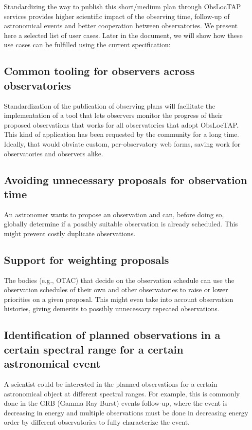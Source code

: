 \documentclass[11pt,a4paper]{ivoa}
\begin{document}
Standardizing the way to publish this short/medium plan through ObsLocTAP
services provides higher scientific impact of the observing time, follow-up of
astronomical events and better cooperation between observatories. We present
here a selected list of user cases. Later in the document, we will show how
these use cases can be fulfilled using the current specification:

\subsection{Common tooling for observers across observatories}
Standardization of the publication of observing plans will facilitate the
implementation of a tool that lets observers monitor the progress of their
proposed observations that works for all observatories that adopt ObsLocTAP.
This kind of application has been requested by the community for a long time.
Ideally, that would obviate custom, per-observatory web forms, saving work for
observatories and observers alike.

\subsection{Avoiding unnecessary proposals for observation time}
An astronomer wants to propose an observation and can, before doing so,
globally determine if a possibly suitable observation is already scheduled.
This might prevent costly duplicate observations.

\subsection{Support for weighting proposals}
The bodies (e.g., OTAC) that decide on the observation schedule can use the
observation schedules of their own and other observatories to raise or lower
priorities on a given proposal. This might even take into account observation
histories, giving demerits to possibly unnecessary repeated observations.

\subsection{Identification of planned observations in a certain spectral range
for a certain astronomical event}
A scientist could be interested in the planned observations for a certain
astronomical object at different spectral ranges. For example, this is commonly
done in the GRB (Gamma Ray Burst) events follow-up, where the event is
decreasing in energy and multiple observations must be done in decreasing energy
order by different observatories to fully characterize the event.
\end{document}
